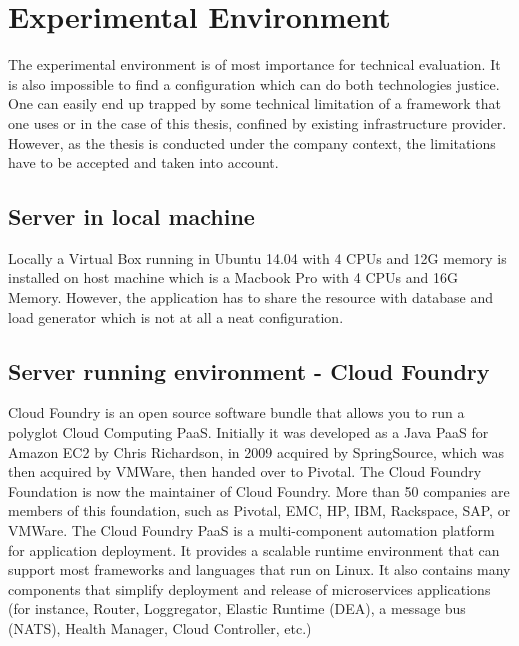 \chapter{Experimental Environment}

The experimental environment is of most importance for technical evaluation. It is also impossible to find a configuration which can do both technologies justice. One can easily end up trapped by some technical limitation of a framework that one uses or in the case of this thesis, confined by existing infrastructure provider. However, as the thesis is conducted under the company context, the limitations have to be accepted and taken into account. 

\section{Server in local machine}
Locally a Virtual Box running in Ubuntu 14.04 with 4 CPUs and 12G memory is installed on host machine which is a Macbook  Pro with 4 CPUs and 16G Memory. However, the application has to share the resource with database and load generator which is not at all a neat configuration. 

\section{Server running environment -  Cloud Foundry}
Cloud Foundry is an open source software bundle that allows you to run a polyglot Cloud Computing \ac{PaaS}. Initially it was developed as a Java \ac{PaaS} for Amazon EC2 by Chris Richardson, in 2009 acquired by SpringSource, which was then acquired by VMWare, then handed over to Pivotal.
The Cloud Foundry Foundation  \citep{Pivotal}  is now the maintainer of Cloud Foundry. More than 50 companies are members of this foundation, such as Pivotal, EMC, HP, IBM, Rackspace, SAP, or VMWare.
The Cloud Foundry PaaS is a multi-component automation platform for application deployment. It provides a scalable runtime environment that can support most frameworks and languages that run on Linux. It also contains many components that simplify deployment and release of microservices applications (for instance, Router, Loggregator, Elastic Runtime (\ac{DEA}), a message bus (NATS), Health Manager, Cloud Controller, etc.)

